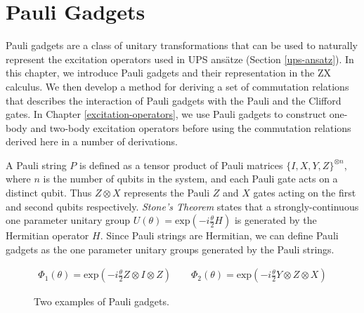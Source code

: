 \chapter{Pauli Gadgets}%
\label{pauli-gadgets}

Pauli gadgets are a class of unitary transformations that can be used to naturally represent the excitation operators used in UPS ansätze (Section \ref{ups-ansatz}). In this chapter, we introduce Pauli gadgets and their representation in the ZX calculus. We then develop a method for deriving a set of commutation relations that describes the interaction of Pauli gadgets with the Pauli and the Clifford gates. In Chapter \ref{excitation-operators}, we use Pauli gadgets to construct one-body and two-body excitation operators before using the commutation relations derived here in a number of derivations.

A Pauli string $P$ is defined as a tensor product of Pauli matrices $\{I, X, Y, Z\}^{\otimes n}$, where $n$ is the number of qubits in the system, and each Pauli gate acts on a distinct qubit. Thus $Z \otimes X$ represents the Pauli $Z$ and $X$ gates acting on the first and second qubits respectively. \textit{Stone's Theorem} \cite{Stone1932} states that a strongly-continuous one parameter unitary group $U(\theta) = \text{exp} \left(- i \frac{\theta}{2} H \right)$ is generated by the Hermitian operator $H$. Since Pauli strings are Hermitian, we can define Pauli gadgets as the one parameter unitary groups generated by the Pauli strings.

\begin{figure}[H]
    \centering
    \begin{gather*}
        \Phi_1(\theta) = \text{exp}\left(- i \frac{\theta}{2} Z \otimes I \otimes Z \right) \qquad
        \Phi_2(\theta) = \text{exp}\left(- i \frac{\theta}{2} Y \otimes Z \otimes X \right)%
    \end{gather*}
    \caption{Two examples of Pauli gadgets.}
\end{figure}
